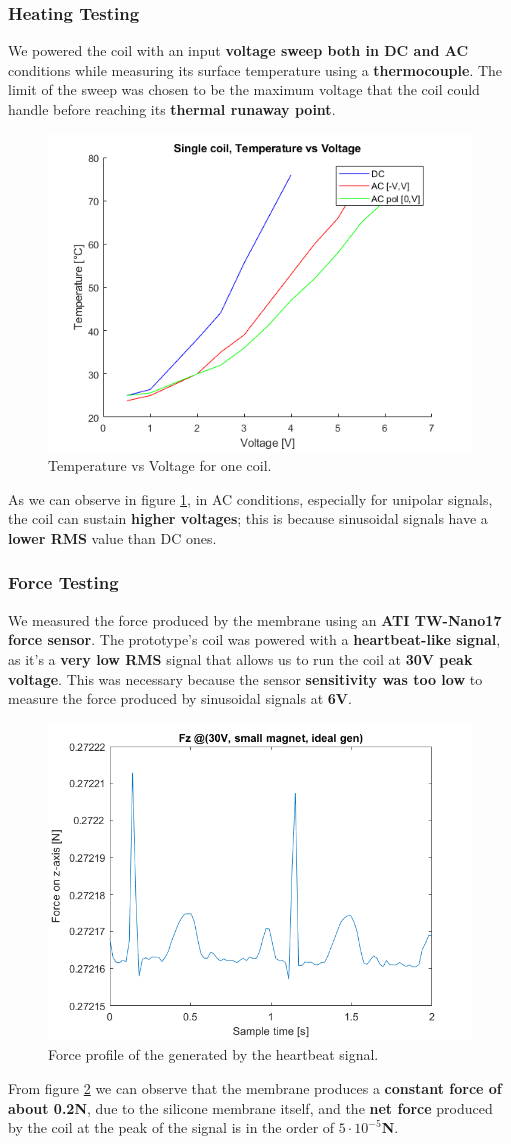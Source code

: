 \subsubsection{Heating Testing}
We powered the coil with an input \textbf{voltage sweep both in DC and AC} conditions while measuring its surface temperature using a \textbf{thermocouple}. The limit of the sweep was chosen to be the maximum voltage that the coil could handle before reaching its \textbf{thermal runaway point}.
\begin{figure}[H]
    \centering
    \includegraphics[width = 0.5\linewidth]{Figures/Temp_vs_Volt_1_coil.png}
    \caption{Temperature vs Voltage for one coil.}
    \label{fig: Single_coil_heating_tests}
\end{figure}
As we can observe in figure \ref{fig: Single_coil_heating_tests}, in AC conditions, especially for unipolar signals, the coil can sustain \textbf{higher voltages}; this is because sinusoidal signals have a \textbf{lower RMS} value than DC ones.

\subsubsection{Force Testing}
We measured the force produced by the membrane using an \textbf{ATI TW-Nano17 force sensor}. The prototype's coil was powered with a \textbf{heartbeat-like signal}, as it's a \textbf{very low RMS} signal that allows us to run the coil at \textbf{30V peak voltage}.
This was necessary because the sensor \textbf{sensitivity was too low} to measure the force produced by sinusoidal signals at \textbf{6V}.
\begin{figure}[H]
    \centering
    \includegraphics[width = 0.5\linewidth]{Figures/Fz_@30V_small_magn_idealgen.png}
    \caption{Force profile of the generated by the heartbeat signal.}
    \label{fig: Force_profile}
\end{figure}
From figure \ref{fig: Force_profile} we can observe that the membrane produces a \textbf{constant force of about 0.2N}, due to the silicone membrane itself, and the \textbf{net force} produced by the coil at the peak of the signal is in the order of \textbf{$5\cdot10^{-5}$N}.